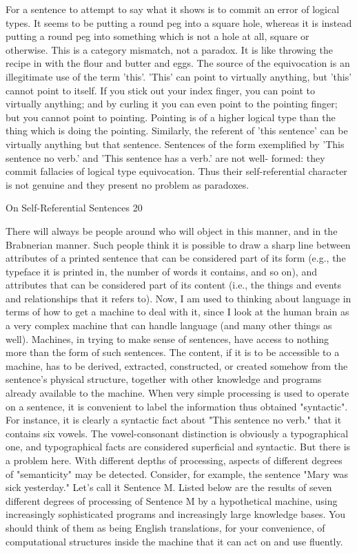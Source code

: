              For a sentence to attempt to say what it shows is to commit an error of logical
   types. It seems to be putting a round peg into a square hole, whereas it is instead
   putting a round peg into something which is not a hole at all, square or otherwise. This
   is a category mismatch, not a paradox. It is like throwing the recipe in with the flour
   and butter and eggs. The source of the equivocation is an illegitimate use of the term
   'this'. 'This' can point to virtually anything, but 'this' cannot point to itself. If you stick
   out your index finger, you can point to virtually anything; and by curling it you can
   even point to the pointing finger; but you cannot point to pointing. Pointing is of a
   higher logical type than the thing which is doing the pointing. Similarly, the referent
   of 'this sentence' can be virtually anything but that sentence. Sentences of the form
   exemplified by 'This sentence no verb.' and 'This sentence has a verb.' are not well-
   formed: they commit fallacies of logical type equivocation. Thus their self-referential
   character is not genuine and they present no problem as paradoxes.


On Self-Referential Sentences                                                                  20

    There will always be people around who will object in this manner, and in the
Brabnerian manner. Such people think it is possible to draw a sharp line between
attributes of a printed sentence that can be considered part of its form (e.g., the typeface it
is printed in, the number of words it contains, and so on), and attributes that can be
considered part of its content (i.e., the things and events and relationships that it refers
to).
    Now, I am used to thinking about language in terms of how to get a machine to deal
with it, since I look at the human brain as a very complex machine that can handle
language (and many other things as well). Machines, in trying to make sense of
sentences, have access to nothing more than the form of such sentences. The content, if it
is to be accessible to a machine, has to be derived, extracted, constructed, or created
somehow from the sentence's physical structure, together with other knowledge and
programs already available to the machine.
    When very simple processing is used to operate on a sentence, it is convenient to label
the information thus obtained "syntactic". For instance, it is clearly a syntactic fact about
"This sentence no verb." that it contains six vowels. The vowel-consonant distinction is
obviously a typographical one, and typographical facts are considered superficial and
syntactic. But there is a problem here. With different depths of processing, aspects of
different degrees of "semanticity" may be detected.
    Consider, for example, the sentence "Mary was sick yesterday." Let's call it Sentence
M. Listed below are the results of seven different degrees of processing of Sentence M by
a hypothetical machine, using increasingly sophisticated programs and increasingly large
knowledge bases. You should think of them as being English translations, for your
convenience, of computational structures inside the machine that it can act on and use
fluently.

